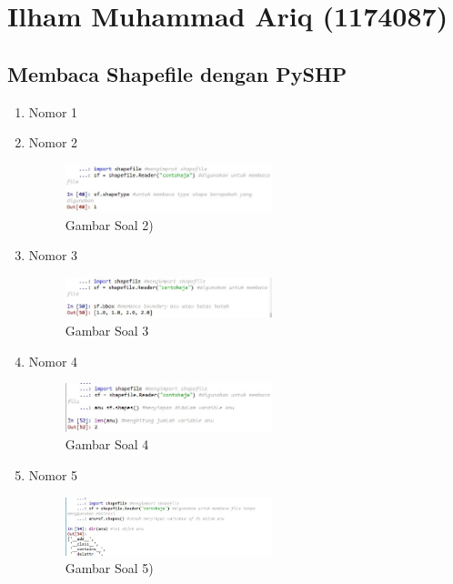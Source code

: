 \section{Ilham Muhammad Ariq (1174087)}
\subsection{Membaca Shapefile dengan PySHP}
\begin{enumerate}
	\item Nomor 1
	
	\item Nomor 2
	
	\begin{figure}[H]
		\includegraphics[width=6cm]{figures/Tugas3/1174087/soal2.jpg}
		\centering
		\caption{Gambar Soal 2)}
	\end{figure}
	\item Nomor 3
	
	\begin{figure}[H]
		\includegraphics[width=6cm]{figures/Tugas3/1174087/soal3.jpg}
		\centering
		\caption{Gambar Soal 3}
	\end{figure}
	\item Nomor 4
	
	\begin{figure}[H]
		\includegraphics[width=6cm]{figures/Tugas3/1174087/soal4.jpg}
		\centering
		\caption{Gambar Soal 4}
	\end{figure}
	\item Nomor 5
	
	\begin{figure}[H]
		\includegraphics[width=6cm]{figures/Tugas3/1174087/soal5.jpg}
		\centering
		\caption{Gambar Soal 5)}
	\end{figure}

\end{enumerate}
